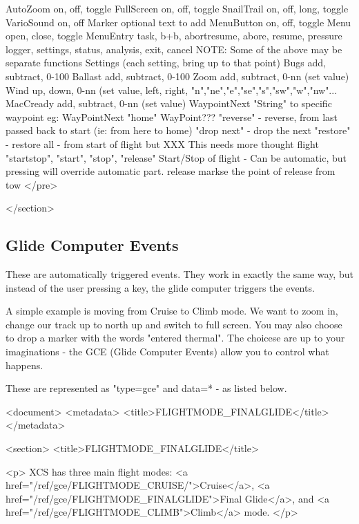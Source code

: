 				AutoZoom		on, off, toggle
				FullScreen		on, off, toggle
				SnailTrail 		on, off, long, toggle
				VarioSound 		on, off
				Marker 			optional text to add
				MenuButton 		on, off, toggle
				Menu			open, close, toggle
				MenuEntry		task, b+b, abortresume, abore, resume, pressure
				logger, settings, status, analysis, exit, cancel
				NOTE: Some of the above may be separate functions
				Settings		(each setting, bring up to that point)
				Bugs			add, subtract, 0-100%
				Ballast			add, subtract, 0-100%
				Zoom			add, subtract, 0-nn (set value)
				Wind			up, down, 0-nn (set value, left, right, "n","ne","e","se","s","sw","w","nw"...
				MacCready		add, subtract, 0-nn (set value)
				WaypointNext		"String" to specific waypoint
				eg: WayPointNext "home"
				WayPoint???		"reverse" - reverse, from last passed back to start (ie: from here to home)
				"drop next" - drop the next
				"restore" - restore all - from start of flight but
				XXX This needs more thought
				flight 			"startstop", "start", "stop", "release"
				Start/Stop of flight - Can be automatic, but pressing will override
				automatic part.
				release 		markse the point of release from tow
</pre>

			</section>


\subsection{Glide Computer Events}

These are automatically triggered events. They work in exactly the
same way, but instead of the user pressing a key, the glide computer
triggers the events.

A simple example is moving from Cruise to Climb mode. We want to zoom
in, change our track up to north up and switch to full screen. You may
also choose to drop a marker with the words "entered thermal". The
choicese are up to your imaginations - the GCE (Glide Computer Events)
allow you to control what happens.

These are represented as "type=gce" and data=* - as listed below.


<document>
        <metadata>
                <title>FLIGHTMODE_FINALGLIDE</title>
        </metadata>

<section>
                <title>FLIGHTMODE_FINALGLIDE</title>

<p>
XCS has three main flight modes: <a
href="/ref/gce/FLIGHTMODE_CRUISE/">Cruise</a>, <a
href="/ref/gce/FLIGHTMODE_FINALGLIDE">Final Glide</a>, and <a
href="/ref/gce/FLIGHTMODE_CLIMB">Climb</a> mode.
</p>

